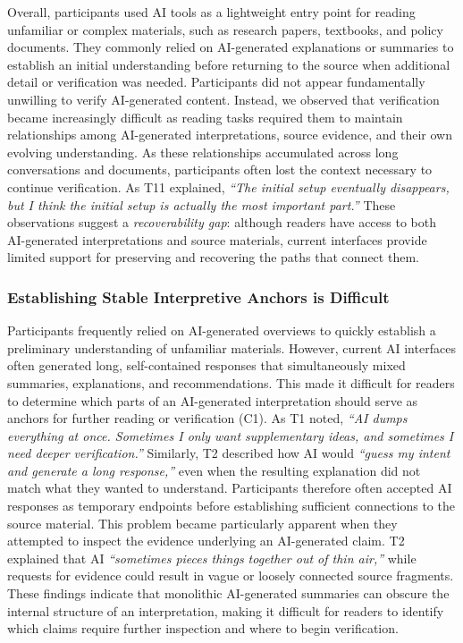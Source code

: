 \documentclass[manuscript,review,anonymous]{acmart}
\begin{document}
Overall, participants used AI tools as a lightweight entry point for reading unfamiliar or complex materials, such as research papers, textbooks, and policy documents. They commonly relied on AI-generated explanations or summaries to establish an initial understanding before returning to the source when additional detail or verification was needed. Participants did not appear fundamentally unwilling to verify AI-generated content. Instead, we observed that verification became increasingly difficult as reading tasks required them to maintain relationships among AI-generated interpretations, source evidence, and their own evolving understanding. As these relationships accumulated across long conversations and documents, participants often lost the context necessary to continue verification. As T11 explained, \textit{``The initial setup eventually disappears, but I think the initial setup is actually the most important part.''} These observations suggest a \textit{recoverability gap}: although readers have access to both AI-generated interpretations and source materials, current interfaces provide limited support for preserving and recovering the paths that connect them.

\subsubsection{\textbf{Establishing Stable Interpretive Anchors is Difficult}}
\label{sec:rupture1}

Participants frequently relied on AI-generated overviews to quickly establish a preliminary understanding of unfamiliar materials. However, current AI interfaces often generated long, self-contained responses that simultaneously mixed summaries, explanations, and recommendations. This made it difficult for readers to determine which parts of an AI-generated interpretation should serve as anchors for further reading or verification (C1). As T1 noted, \textit{``AI dumps everything at once. Sometimes I only want supplementary ideas, and sometimes I need deeper verification.''} Similarly, T2 described how AI would \textit{``guess my intent and generate a long response,''} even when the resulting explanation did not match what they wanted to understand. Participants therefore often accepted AI responses as temporary endpoints before establishing sufficient connections to the source material. This problem became particularly apparent when they attempted to inspect the evidence underlying an AI-generated claim. T2 explained that AI \textit{``sometimes pieces things together out of thin air,''} while requests for evidence could result in vague or loosely connected source fragments. These findings indicate that monolithic AI-generated summaries can obscure the internal structure of an interpretation, making it difficult for readers to identify which claims require further inspection and where to begin verification.
\end{document}
